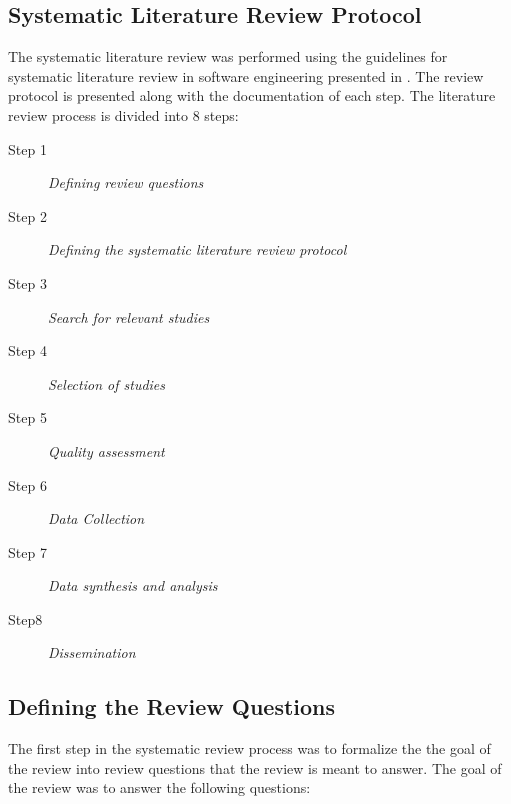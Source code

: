 \documentclass[a4paper]{book}
\begin{document}
\begin{appendices}

\chapter{Systematic Literature Review Protocol}\label{T-B}
\label{cha:STL}



The systematic literature review was performed using the guidelines for systematic 
literature review in software engineering presented in \cite{keele_guidelines_2007}.
The review protocol is presented along with the documentation of each step.
The literature review process is divided into 8 steps: %

\begin{description}
\item[Step 1] {\it Defining review questions}

\item[Step 2] {\it Defining the systematic literature review protocol}

\item[Step 3] {\it Search for relevant studies}

\item[Step 4] {\it Selection of studies}

\item[Step 5] {\it Quality assessment}

\item[Step 6] {\it Data Collection}

\item[Step 7] {\it Data synthesis and analysis}

\item[Step8] {\it Dissemination}

\end{description}

\clearpage 

\section{Defining the Review Questions}
The first step in the systematic review process was to formalize the the goal of the review into review questions that the review is meant to answer. The goal of the review was to answer the following questions:


\end{appendices}
\end{document}
